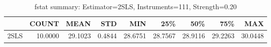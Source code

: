 \begin{table}[ht]
\centering
\caption{fstat summary: Estimator=2SLS, Instruments=111, Strength=0.20}
\begin{tabular}{lrrrrrrrr}
\toprule
 & COUNT & MEAN & STD & MIN & 25\% & 50\% & 75\% & MAX \\
\midrule
2SLS & 10.0000 & 29.1023 & 0.4844 & 28.6751 & 28.7567 & 28.9116 & 29.2263 & 30.0448 \\
\bottomrule
\end{tabular}
\end{table}
